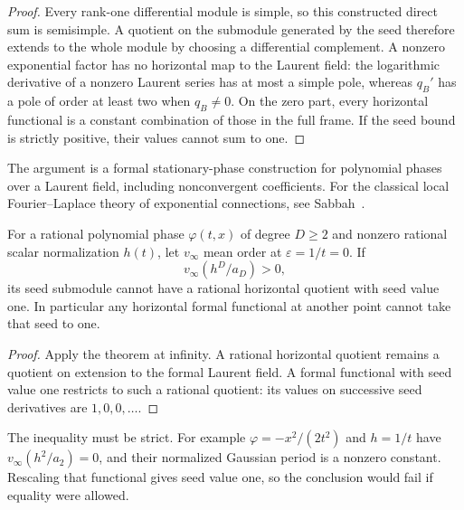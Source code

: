 \begin{proof}
Every rank-one differential module is simple, so this constructed
direct sum is semisimple. A quotient on the submodule generated by
the seed therefore extends to the whole module by choosing a
differential complement. A nonzero exponential factor has no
horizontal map to the Laurent field: the logarithmic derivative of
a nonzero Laurent series has at most a simple pole, whereas $q_B'$
has a pole of order at least two when $q_B\ne0$. On the zero part,
every horizontal functional is a constant combination of those in
the full frame. If the seed bound is strictly positive, their values
cannot sum to one.
\end{proof}

The argument is a formal stationary-phase construction for polynomial
phases over a Laurent field, including nonconvergent coefficients.
For the classical local Fourier--Laplace theory of exponential
connections, see Sabbah~\cite{SabbahStationary}.

\begin{corollary}\label{cor:leadingobstruction}
For a rational polynomial phase $\varphi(t,x)$ of degree $D\geq2$
and nonzero rational scalar normalization $h(t)$, let $v_\infty$
mean order at $\varepsilon=1/t=0$. If
\begin{equation}\label{eq:leadingcriterion}
 v_\infty(h^D/a_D)>0,
\end{equation}
its seed submodule cannot have a rational horizontal quotient with
seed value one. In particular any horizontal formal functional at
another point cannot take that seed to one.
\end{corollary}
\begin{proof}
Apply the theorem at infinity. A rational horizontal quotient remains
a quotient on extension to the formal Laurent field. A formal
functional with seed value one restricts to such a rational quotient:
its values on successive seed derivatives are $1,0,0,\ldots$.
\end{proof}

The inequality must be strict. For example
$\varphi=-x^2/(2t^2)$ and $h=1/t$ have
$v_\infty(h^2/a_2)=0$, and their normalized Gaussian period is a
nonzero constant. Rescaling that functional gives seed value one,
so the conclusion would fail if equality were allowed.

